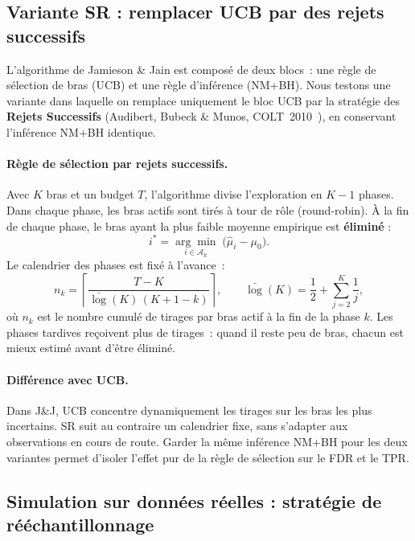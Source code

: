 \documentclass[10.5pt,a4paper]{article}
\begin{document}
\subsection{Variante SR : remplacer UCB par des rejets successifs}

L'algorithme de Jamieson \& Jain est composé de deux blocs~:
une règle de sélection de bras (UCB) et une règle d'inférence (NM+BH).
Nous testons une variante dans laquelle on remplace uniquement le bloc
UCB par la stratégie des \textbf{Rejets Successifs}
(Audibert, Bubeck \& Munos, COLT~2010~\cite{audibert2010}),
en conservant l'inférence NM+BH identique.

\paragraph{Règle de sélection par rejets successifs.}
Avec $K$ bras et un budget $T$, l'algorithme divise l'exploration en
$K-1$ phases. Dans chaque phase, les bras actifs sont tirés à tour de
rôle (round-robin). À la fin de chaque phase, le bras ayant la plus
faible moyenne empirique est \textbf{éliminé} :
\[
  i^* = \underset{i \in \mathcal{A}_k}{\arg\min}
  \;\bigl(\hat{\mu}_i - \mu_0\bigr).
\]
Le calendrier des phases est fixé à l'avance~:
\[
  n_k = \left\lceil \frac{T - K}{\bar{\log}(K)\,(K + 1 - k)} \right\rceil,
  \qquad
  \bar{\log}(K) = \frac{1}{2} + \sum_{j=2}^{K} \frac{1}{j},
\]
où $n_k$ est le nombre cumulé de tirages par bras actif à la fin de
la phase $k$. Les phases tardives reçoivent plus de tirages~: quand
il reste peu de bras, chacun est mieux estimé avant d'être éliminé.

\paragraph{Différence avec UCB.}
Dans J\&J, UCB concentre dynamiquement les tirages sur les bras les
plus incertains. SR suit au contraire un calendrier fixe, sans
s'adapter aux observations en cours de route. Garder la même inférence
NM+BH pour les deux variantes permet d'isoler l'effet pur de la règle
de sélection sur le FDR et le TPR.

\subsection{Simulation sur donn\'ees r\'eelles : strat\'egie de rééchantillonnage}
\end{document}
